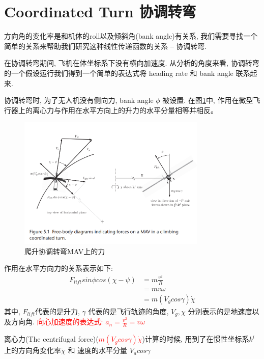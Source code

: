 \documentclass[UTF8,a4paper,10pt,nocolorlinks]{ctexart}
\begin{document}
    \section{Coordinated Turn 协调转弯}
    方向角的变化率是和机体的roll以及倾斜角(bank angle)有关系, 我们需要寻找一个简单的关系来帮助我们研究这种线性传递函数的关系 -- 协调转弯. \par
    在协调转弯期间, 飞机在体坐标系下没有横向加速度. 从分析的角度来看, 协调转弯的一个假设运行我们得到一个简单的表达式将 heading rate 和 bank angle 联系起来. \par
    协调转弯时, 为了无人机没有侧向力, bank angle $\phi$ 被设置.
    在图\ref{fig:1}中, 作用在微型飞行器上的离心力与作用在水平方向上的升力的水平分量相等并相反。
    \begin{figure}[htpb]
        \centering
        \includegraphics[width=0.8\textwidth]{pictures/5_1.png}
        \caption{爬升协调转弯MAV上的力}
        \label{fig:1}
    \end{figure}
    \par 作用在水平方向力的关系表示如下: 
    \begin{align}
        F_{lift} sin \phi cos (\chi - \psi) &= m \frac{v^{2}}{R} \nonumber \\
        &= m v \omega \nonumber \\
        &= m (V_{g} cos \gamma) \dot{\chi} 
        \label{equ:1}
    \end{align}
    其中, $F_{lift}$代表的是升力, $\gamma$ 代表的是飞行轨迹的角度, $V_{g}, \chi$ 分别表示的是地速度以及方向角. \textcolor{red}{向心加速度的表达式: $a_{n} = \frac{v^{2}}{R} = v \omega$}
    \par 离心力(The centrifugal force)(\textcolor{red}{$m (V_{g} cos \gamma) \dot{\chi} $})计算的时候, 用到了在惯性坐标系$k^{i}$上的方向角变化率$\dot{\chi}$ 和 速度的水平分量 $V_{a}cos \gamma$
\end{document}
